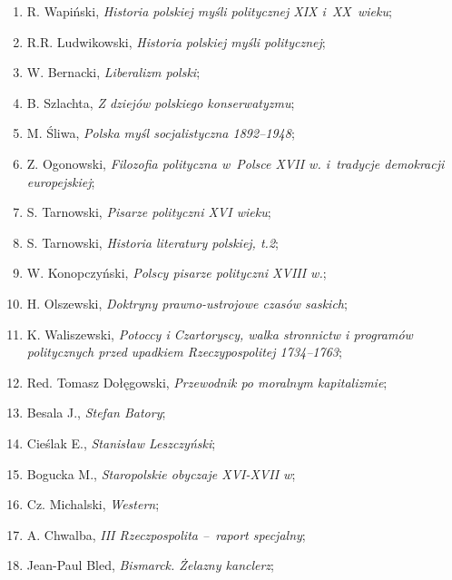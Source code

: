 \documentclass[a4paper,11pt]{article}
\begin{document}
\begin{enumerate}
\item R. Wapiński, \emph{Historia polskiej myśli politycznej XIX
    i~XX~wieku};

\item R.R. Ludwikowski, \emph{Historia polskiej myśli politycznej};

\item W. Bernacki, \emph{Liberalizm polski};

\item B. Szlachta, \emph{Z dziejów polskiego konserwatyzmu};

\item M. Śliwa, \emph{Polska myśl socjalistyczna 1892--1948};

\item Z. Ogonowski, \emph{Filozofia polityczna w~Polsce XVII w.
    i~tradycje demokracji europejskiej};

\item S. Tarnowski, \emph{Pisarze polityczni XVI wieku};

\item S. Tarnowski, \emph{Historia literatury polskiej, t.2};

\item W. Konopczyński, \emph{Polscy pisarze polityczni XVIII w.};

\item H. Olszewski, \emph{Doktryny prawno-ustrojowe czasów saskich};
\item K. Waliszewski, \emph{Potoccy i Czartoryscy, walka stronnictw i
    programów politycznych przed upadkiem Rzeczypospolitej 1734--1763};

\item Red. Tomasz Dołęgowski, \emph{Przewodnik po moralnym
    kapitalizmie};

\item Besala J., \emph{Stefan Batory};

\item Cieślak E., \emph{Stanisław Leszczyński};

\item Bogucka M., \emph{Staropolskie obyczaje XVI-XVII w};

\item Cz. Michalski, \emph{Western};

\item A. Chwalba, \emph{III Rzeczpospolita --~raport specjalny};

\item Jean-Paul Bled, \emph{Bismarck. Żelazny kanclerz};


\end{enumerate}
\end{document}
